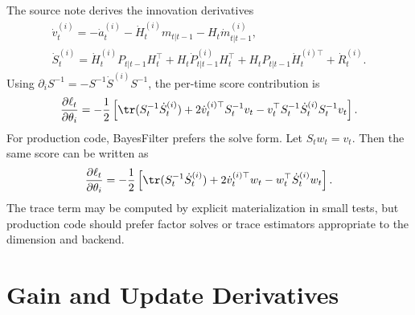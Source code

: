 The source note derives the innovation derivatives
\begin{align}
\label{eq:bf-score-innovation-first}
  \dot v_t^{(i)}
  =
  -\dot a_t^{(i)}
  -\dot H_t^{(i)}m_{t|t-1}
  -H_t\dot m_{t|t-1}^{(i)},\\
\label{eq:bf-score-innovation-cov-first}
  \dot S_t^{(i)}
  =
  \dot H_t^{(i)}P_{t|t-1}H_t^\top
  +H_t\dot P_{t|t-1}^{(i)}H_t^\top
  +H_tP_{t|t-1}\dot H_t^{(i)\top}
  +\dot R_t^{(i)}.
\end{align}
Using $\partial_i S^{-1}=-S^{-1}\dot S^{(i)}S^{-1}$, the per-time score
contribution is
\begin{equation}
\label{eq:bf-kalman-score-contribution}
  \frac{\partial \ell_t}{\partial \theta_i}
  =
  -\frac{1}{2}
  \left[
    \tr(S_t^{-1}\dot S_t^{(i)})
    +2\dot v_t^{(i)\top}S_t^{-1}v_t
    -v_t^\top S_t^{-1}\dot S_t^{(i)}S_t^{-1}v_t
  \right].
\end{equation}
For production code, BayesFilter prefers the solve form.  Let $S_tw_t=v_t$.
Then the same score can be written as
\begin{equation}
\label{eq:bf-solve-score}
  \frac{\partial \ell_t}{\partial \theta_i}
  =
  -\frac{1}{2}
  \left[
    \tr(S_t^{-1}\dot S_t^{(i)})
    +2\dot v_t^{(i)\top}w_t
    -w_t^\top\dot S_t^{(i)}w_t
  \right].
\end{equation}
The trace term may be computed by explicit materialization in small tests, but
production code should prefer factor solves or trace estimators appropriate to
the dimension and backend.

\section{Gain and Update Derivatives}
\label{sec:bf-score-update-derivatives}

